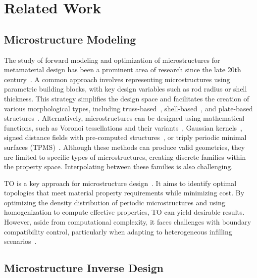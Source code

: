 \section{Related Work}
\label{sec:related}


\subsection{Microstructure Modeling}

The study of forward modeling and optimization of microstructures for metamaterial design has been a prominent area of research since the late 20th century~\cite{Lakes1987}.
A common approach involves representing microstructures using parametric building blocks, with key design variables such as rod radius or shell thickness. This strategy simplifies the design space and facilitates the creation of various morphological types, including truss-based~\cite{nazir2019Stateoftheart, ling2019Mechanical, choi2016Nonlinear, panetta2015Elastic,Liu2022}, shell-based~\cite{bonatti2019Mechanical, overvelde2016Threedimensional, ion2016Metamaterial, ion2018Metamaterial, liu2022Parametric}, and plate-based structures~\cite{wang2020Quasiperiodica,Sun2023}.
Alternatively, microstructures can be designed using mathematical functions, such as Voronoi tessellations and their variants~\cite{martinez2016Procedural, martinez2017Orthotropic, martinez2018Polyhedral}, Gaussian kernels~\cite{tian2020Organic,Bastek2023}, signed distance fields with pre-computed structures~\cite{schumacher2015Microstructures}, or triply periodic minimal surfaces (TPMS)~\cite{hu2020Cellular, yan2020Strong, hu2019Lightweight}.
%
Although these methods can produce valid geometries, they are limited to specific types of microstructures, creating discrete families within the property space. Interpolating between these families is also challenging.

TO is a key approach for microstructure design~\cite{Sigmund1994, Coelho2007, Zhang2023Optimized}. It aims to identify optimal topologies that meet material property requirements while minimizing cost. By optimizing the density distribution of periodic microstructures and using homogenization to compute effective properties, TO can yield desirable results. However, aside from computational complexity, it faces challenges with boundary compatibility control, particularly when adapting to heterogeneous infilling scenarios~\cite{Cheng2017,wu2018Infill}.

\subsection{Microstructure Inverse Design}

